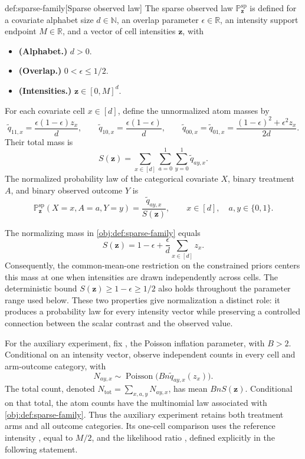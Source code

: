 \documentclass[11pt]{article}
\begin{document}
\begin{definitionv}{def:sparse-family}[Sparse observed law]
The sparse observed law \(\mathbb P_{\mathbf z}^{\mathrm{sp}}\) is defined for a covariate alphabet size \(d\in\mathbb N\), an overlap parameter \(\epsilon\in\mathbb R\), an intensity support endpoint \(M\in\mathbb R\), and a vector of cell intensities \(\mathbf z\), with
\begin{itemize}
\item \textbf{(Alphabet.)} \(d>0\).
\item \textbf{(Overlap.)} \(0<\epsilon\le 1/2\).
\item \textbf{(Intensities.)} \(\mathbf z\in[0,M]^d\).
\end{itemize}
For each covariate cell \(x\in[d]\), define the unnormalized atom masses by
\[
\widetilde q_{11,x}=\frac{\epsilon(1-\epsilon)z_x}{d},
\qquad
\widetilde q_{10,x}=\frac{\epsilon(1-\epsilon)}{d},
\qquad
\widetilde q_{00,x}=\widetilde q_{01,x}
=\frac{(1-\epsilon)^2+\epsilon^2z_x}{2d}.
\]
Their total mass is
\[
S(\mathbf z)
=\sum_{x\in[d]}\sum_{a=0}^1\sum_{y=0}^1\widetilde q_{ay,x}.
\]
The normalized probability law of the categorical covariate \(X\), binary treatment \(A\), and binary observed outcome \(Y\) is
\[
\mathbb P_{\mathbf z}^{\mathrm{sp}}(X=x,A=a,Y=y)
=\frac{\widetilde q_{ay,x}}{S(\mathbf z)},
\qquad x\in[d],\quad a,y\in\{0,1\}.
\]
\end{definitionv}

The normalizing mass  in \cref{obj:def:sparse-family} equals
\[
S(\mathbf z)=1-\epsilon+\frac{\epsilon}{d}\sum_{x\in[d]}z_x.
\]
Consequently, the common-mean-one restriction on the constrained priors centers this mass at one when intensities are drawn independently across cells. The deterministic bound \(S(\mathbf z)\ge 1-\epsilon\ge 1/2\) also holds throughout the parameter range used below. These two properties give normalization a distinct role: it produces a probability law for every intensity vector while preserving a controlled connection between the scalar contrast and the observed value.

For the auxiliary experiment, fix , the Poisson inflation parameter, with \(B>2\). Conditional on an intensity vector, observe independent counts in every cell and arm-outcome category, with
\[
N_{ay,x}\sim\operatorname{Poisson}
\bigl(Bn\widetilde q_{ay,x}(z_x)\bigr).
\]
The total count, denoted \(N_{\mathrm{tot}}=\sum_{x,a,y}N_{ay,x}\), has mean \(BnS(\mathbf z)\). Conditional on that total, the atom counts have the multinomial law associated with \cref{obj:def:sparse-family}. Thus the auxiliary experiment retains both treatment arms and all outcome categories. Its one-cell comparison uses the reference intensity , equal to \(M/2\), and the likelihood ratio , defined explicitly in the following statement.
\end{document}
